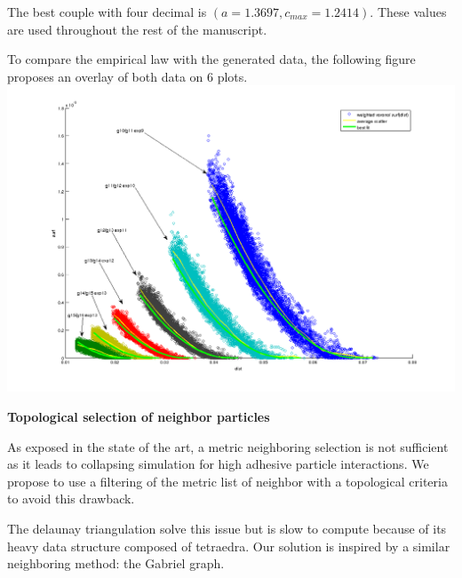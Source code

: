 The best couple with four decimal is $(a=1.3697 , c_{max}=1.2414)$. These values are used throughout the rest of the manuscript.

To compare the empirical law with the generated data, the following figure proposes an overlay of both data on 6 plots.
\includegraphics{../../images/MECAGEN/spatial_neighb/multi_scatter_gp1_gp2_exp9_14.png}

\textbf{Topological selection of neighbor particles}

As exposed in the state of the art, a metric neighboring selection is not sufficient as it leads to collapsing simulation for high adhesive particle interactions. We propose to use a filtering of the metric list of neighbor with a topological criteria to avoid this drawback.

The delaunay triangulation solve this issue but is slow to compute because of its heavy data structure composed of tetraedra. Our solution is inspired by a similar neighboring method: the Gabriel graph.

